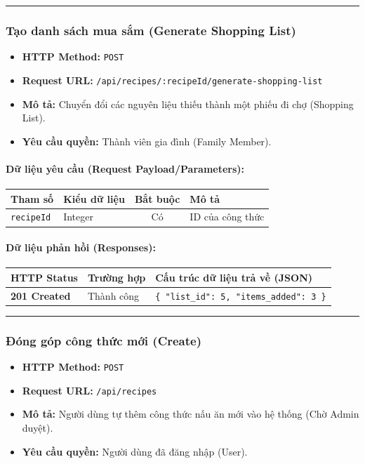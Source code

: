 \documentclass[12pt,a4paper]{article}
\begin{document}
\vskip 0.4cm
\noindent\rule{\textwidth}{0.3pt}
\vskip 0.4cm

\subsubsection{Tạo danh sách mua sắm (Generate Shopping List)}
\begin{itemize}[leftmargin=*]
    \item \textbf{HTTP Method:} \texttt{POST}
    \item \textbf{Request URL:} \texttt{/api/recipes/:recipeId/generate-shopping-list}
    \item \textbf{Mô tả:} Chuyển đổi các nguyên liệu thiếu thành một phiếu đi chợ (Shopping List).
    \item \textbf{Yêu cầu quyền:} Thành viên gia đình (Family Member).
\end{itemize}

\paragraph{Dữ liệu yêu cầu (Request Payload/Parameters):}
\begin{longtable}{|>{\raggedright\arraybackslash}p{2.8cm}|>{\raggedright\arraybackslash}p{2.2cm}|c|>{\raggedright\arraybackslash}p{7.0cm}|}
\hline
\textbf{Tham số} & \textbf{Kiểu dữ liệu} & \textbf{Bắt buộc} & \textbf{Mô tả} \\ \hline
\endhead
\texttt{recipeId} & Integer & Có & ID của công thức \\ \hline
\end{longtable}

\paragraph{Dữ liệu phản hồi (Responses):}
\begin{longtable}{|>{\raggedright\arraybackslash}p{2.8cm}|>{\raggedright\arraybackslash}p{3.2cm}|>{\raggedright\arraybackslash}p{8.0cm}|}
\hline
\textbf{HTTP Status} & \textbf{Trường hợp} & \textbf{Cấu trúc dữ liệu trả về (JSON)} \\ \hline
\endhead
\textbf{201 Created} & Thành công & \texttt{\{ "list\_id": 5, "items\_added": 3 \}} \\ \hline
\end{longtable}

\vskip 0.4cm
\noindent\rule{\textwidth}{0.3pt}
\vskip 0.4cm

\subsubsection{Đóng góp công thức mới (Create)}
\begin{itemize}[leftmargin=*]
    \item \textbf{HTTP Method:} \texttt{POST}
    \item \textbf{Request URL:} \texttt{/api/recipes}
    \item \textbf{Mô tả:} Người dùng tự thêm công thức nấu ăn mới vào hệ thống (Chờ Admin duyệt).
    \item \textbf{Yêu cầu quyền:} Người dùng đã đăng nhập (User).
\end{itemize}
\end{document}
